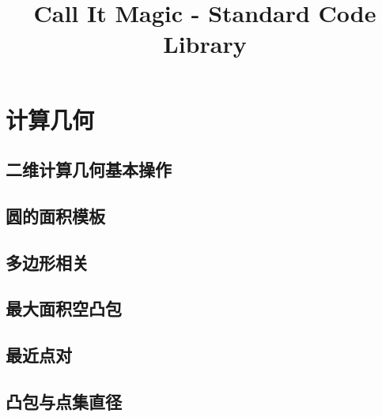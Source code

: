 \documentclass[10pt, a4paper]{article}
\begin{document}
\title{Call It Magic - Standard Code Library}
\date{}
\tableofcontents
\newpage

\section{计算几何}

  \subsection{二维计算几何基本操作}
    
    
  \subsection{圆的面积模板}
    

  \subsection{多边形相关}
    

  \subsection{最大面积空凸包}
    

  \subsection{最近点对}
    

  \subsection{凸包与点集直径}
    
\end{document}
